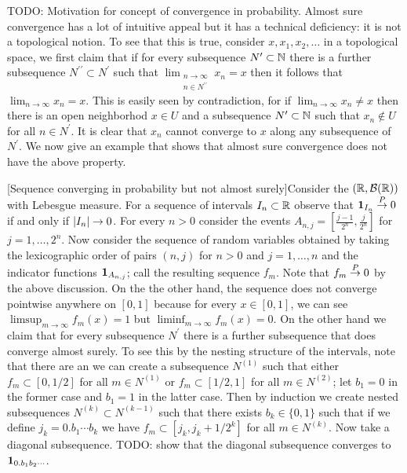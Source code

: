 TODO: Motivation for concept of convergence in probability.  Almost
sure convergence has a lot of intuitive appeal but it has a
technical deficiency: it is not a topological notion.  To see that this is true, consider
$x, x_1, x_2, \dotsc$ in a topological space, we
first claim that 
if for every subsequence $N^\prime \subset \mathbb{N}$ there is a further subsequence
$N^{\prime \prime} \subset N^\prime$ such that $\lim_{\substack{n \to \infty \\ n \in N^{\prime \prime}}} x_n = x$
then it follows that $\lim_{n \to \infty} x_n = x$.  This is easily seen by contradiction, for if $\lim_{n \to \infty} x_n \neq x$
then there is an open neighborhod $x \in U$ and a subsequence $N^\prime \subset \mathbb{N}$ such that $x_n \notin U$ for all
$n \in N^\prime$.  It is clear that $x_n$ cannot converge to $x$ along any subsequence of $N^\prime$.  We now give an example
that shows that almost sure convergence does not have the above property.

\begin{examp}\label{ConvergeProbabilityNotAlmostSure}[Sequence converging in probability but not almost
  surely]Consider the $(\mathbb{R}, \mathcal{B}(\mathbb{R}))$ with Lebesgue
  measure.  For a sequence of intervals $I_n \subset \mathbb{R}$ observe
  that $\textbf{1}_{I_n} \overset{P}\to 0$ if and only if $\left \vert I_n \right \vert \to
  0$.  For every $n > 0$ consider the events $A_{n,j} =
  [\frac{j-1}{2^n}, \frac{j}{2^n}]$ for $j=1, \dots, 2^n$.  Now consider the
  sequence of random variables obtained by taking the lexicographic
  order of pairs $(n,j)$ for $n>0$ and $j=1,\dots, n$ and the
  indicator functions $\textbf{1}_{A_{n,j}}$; call the
  resulting sequence $f_m$.  
Note that $f_m
\overset{P}\to 0$ by the
above discussion.  On the the other hand, the sequence does not
converge pointwise anywhere on $[0,1]$ because for every $x \in [0,1]$, we can
see $\limsup_{m \to \infty} f_m(x) = 1$ but $\liminf_{m \to \infty} f_m(x) = 0$.  On the other hand
we claim that for every subsequence $N^\prime$ there is a further subsequence that does converge almost surely.
To see this by the nesting structure of the intervals, note that there are an we can create a subsequence $N^{(1)}$ such
that either $f_m \subset [0,1/2]$ for all $m \in N^{(1)}$ or  $f_m \subset [1/2,1]$ for all $m \in N^{(2)}$; let $b_1=0$ in the former case and
$b_1 = 1$ in the latter case.  Then by induction
we create nested subsequences $N^{(k)} \subset N^{(k-1)}$ such that there exists $b_k \in \lbrace 0,1 \rbrace$ such that if we
define $j_k=0.b_1 \dotsb b_k$ we have
$f_m \subset [j_k,j_k+1/2^{k}]$ for all $m \in N^{(k)}$.  Now take a diagonal subsequence.  TODO: show that
the diagonal subsequence converges to $\textbf{1}_{0.b_1b_2\dotsb}$.
\end{examp}

